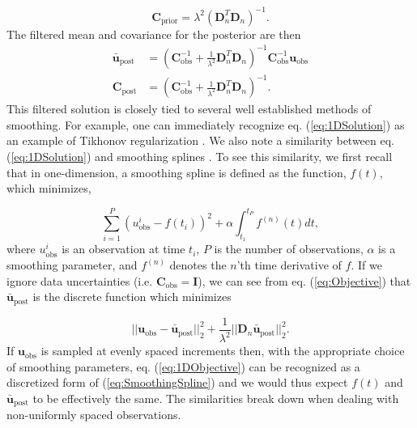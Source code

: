 \documentclass[10pt,a4paper]{article}
\begin{document}
\begin{equation}\label{eq:ExplicitPrior1D}
\mathbf{C_\mathrm{prior}} = \lambda^2(\mathbf{D}_n^T\mathbf{D}_n)^{-1}.
\end{equation}
The filtered mean and covariance for the posterior are then 
\begin{equation}\label{eq:1DSolution}
\begin{split}
\mathbf{\bar{u}}_\mathrm{post} &= (\mathbf{C}_\mathrm{obs}^{-1} +   
                   \frac{1}{\lambda^2}\mathbf{D}_n^T\mathbf{D}_n)^{-1}\mathbf{C}_\mathrm{obs}^{-1}
                   \mathbf{u}_\mathrm{obs}
\\
\mathbf{C}_\mathrm{post} &= (\mathbf{C}_\mathrm{obs}^{-1} +   
                            \frac{1}{\lambda^2}\mathbf{D}_n^T\mathbf{D}_n)^{-1}.
\end{split}
\end{equation}
This filtered solution is closely tied to several well established methods of smoothing.  For example, one can immediately recognize eq. (\ref{eq:1DSolution}) as an example of Tikhonov regularization \citep{Tikhonov1978}. We also note a similarity between eq. (\ref{eq:1DSolution}) and smoothing splines \citep{Wahba1990}.  To see this similarity, we first recall that in one-dimension, a smoothing spline is defined as the function, $f(t)$, which minimizes,

\begin{equation}\label{eq:SmoothingSpline}
\sum_{i=1}^P (u_\mathrm{obs}^i - f(t_i))^2 + \alpha \int_{t_1}^{t_P} f^{(n)}(t) dt,
\end{equation}
where $u_\mathrm{obs}^i$ is an observation at time $t_i$, $P$ is the number of observations, $\alpha$ is a smoothing parameter, and $f^{(n)}$ denotes the $n$'th time derivative of $f$.
If we ignore data uncertainties (i.e. $\mathbf{C}_\mathrm{obs}=\mathbf{I}$), we can see from eq. (\ref{eq:Objective}) that $\mathbf{\bar{u}}_\mathrm{post}$ is the discrete function which minimizes  

\begin{equation}\label{eq:1DObjective}
||\mathbf{u}_\mathrm{obs} - \mathbf{\bar{u}}_\mathrm{post}||_2^2 + \frac{1}{\lambda^2}||\mathbf{D}_n\mathbf{\bar{u}}_\mathrm{post}||_2^2.
\end{equation} 
If $\mathbf{u}_\mathrm{obs}$ is sampled at evenly spaced increments then, with the appropriate choice of smoothing parameters, eq. (\ref{eq:1DObjective}) can be recognized as a discretized form of (\ref{eq:SmoothingSpline}) and we would thus expect $f(t)$ and $\mathbf{\bar{u}}_\mathrm{post}$ to be effectively the same. The similarities break down when dealing with non-uniformly spaced observations.  
\end{document}
